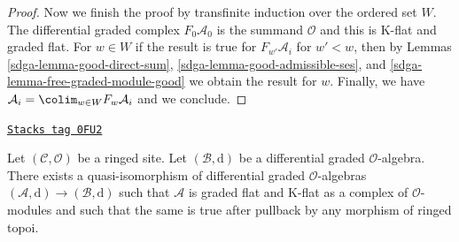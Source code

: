 \begin{proof}
\medskip\noindent
Now we finish the proof by transfinite induction over the ordered
set $W$. The differential graded complex $F_0\mathcal{A}_0$ is
the summand $\mathcal{O}$ and this is K-flat and graded flat.
For $w \in W$ if the result is true for $F_{w'}\mathcal{A}_i$
for $w' < w$, then by Lemmas \ref{sdga-lemma-good-direct-sum},
\ref{sdga-lemma-good-admissible-ses}, and \ref{sdga-lemma-free-graded-module-good}
we obtain the result for $w$. Finally, we have
$\mathcal{A}_i = \colim_{w \in W} F_w\mathcal{A}_i$ and
we conclude.
\end{proof}

\begin{lemma}
\label{sdga-lemma-good-dga}
\href{https://stacks.math.columbia.edu/tag/0FU2}{\texttt{Stacks tag 0FU2}}

Let $(\mathcal{C}, \mathcal{O})$ be a ringed site.
Let $(\mathcal{B}, \text{d})$ be a differential graded $\mathcal{O}$-algebra.
There exists a quasi-isomorphism of differential graded $\mathcal{O}$-algebras
$(\mathcal{A}, \text{d}) \to (\mathcal{B}, \text{d})$ such that
$\mathcal{A}$ is graded flat and K-flat as a complex of $\mathcal{O}$-modules
and such that the same is true after pullback by any morphism of
ringed topoi.
\end{lemma}

